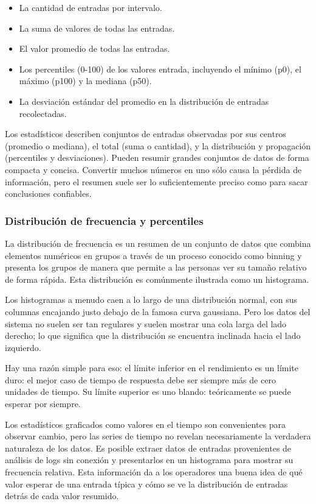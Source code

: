 \begin{itemize}
  \item La cantidad de entradas por intervalo.
  \item La suma de valores de todas las entradas.
  \item El valor promedio de todas las entradas.
  \item Los percentiles (0-100) de los valores entrada, incluyendo el mínimo (p0), el máximo (p100) y la mediana (p50).
  \item La desviación estándar del promedio en la distribución de entradas recolectadas.
\end{itemize}

Los estadísticos describen conjuntos de entradas observadas por sus centros (promedio o mediana), el total (suma o cantidad), y la distribución y propagación (percentiles y desviaciones). Pueden resumir grandes conjuntos de datos de forma compacta y concisa. Convertir muchos números en uno sólo causa la pérdida de información, pero el resumen suele ser lo suficientemente preciso como para sacar conclusiones confiables.

\subsubsection*{Distribución de frecuencia y percentiles}
\label{distribucion_de_frecuencia_y_percentiles}

La distribución de frecuencia es un resumen de un conjunto de datos que combina elementos numéricos en grupos a través de un proceso conocido como binning y presenta los grupos de manera que permite a las personas ver su tamaño relativo de forma rápida. Esta distribución es comúnmente ilustrada como un histograma.

Los histogramas a menudo caen a lo largo de una distribución normal, con sus columnas encajando justo debajo de la famosa curva gaussiana. Pero los datos del sistema no suelen ser tan regulares y suelen mostrar una cola larga del lado derecho; lo que significa que la distribución se encuentra inclinada hacia el lado izquierdo.

Hay una razón simple para eso: el límite inferior en el rendimiento es un límite duro: el mejor caso de tiempo de respuesta debe ser siempre más de cero unidades de tiempo. Su límite superior es uno blando: teóricamente se puede esperar por siempre.

Los estadísticos graficados como valores en el tiempo son convenientes para observar cambio, pero las series de tiempo no revelan necesariamente la verdadera naturaleza de los datos. Es posible extraer datos de entradas provenientes de análisis de logs sin conexión y presentarlos en un histograma para mostrar su frecuencia relativa. Esta información da a los operadores una buena idea de qué valor esperar de una entrada típica y cómo se ve la distribución de entradas detrás de cada valor resumido.

